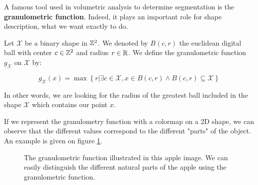A famous tool used in volumetric analysis to determine segmentation is the \textbf{granulometric function}. Indeed, it plays an important role for shape description, what we want exactly to do.

\begin{definition}
Let $\mathcal{X}$ be a binary shape in $\mathbb{Z}^{2}$. We denoted by $B(c,r)$ the euclidean digital ball with center $c \in \mathbb{Z}^{2}$ and radius $r \in \mathbb{R}$. We define the granulometric function $g_{\mathcal{X}}$ on $\mathcal{X}$ by:

$$ g_{\mathcal{X}}(x) = \operatorname{max} \left\{ r | \exists c \in \mathcal{X}, x \in B(c,r) \wedge B(c,r) \subseteq \mathcal{X} \right\} $$ 
\end{definition}

In other words, we are looking for the radius of the greatest ball included in the shape $\mathcal{X}$ which contains our point $x$.

If we represent the granulometry function with a colormap on a 2D shape, we can observe that the different values correspond to the different "parts" of the object. An example is given on figure \ref{apple-granulo}.

\begin{figure}[!ht]
    \centering
    \qquad\qquad\qquad
    \caption{The granulometric function illustrated in this apple image. We can easily distinguish the different natural parts of the apple using the granulometric function.}
    \label{apple-granulo}
\end{figure}

